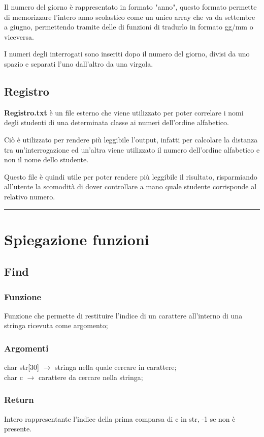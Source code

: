 \documentclass[14pt]{extarticle}
\begin{document}
Il numero del giorno è rappresentato in formato "anno", questo formato permette di memorizzare l'intero anno scolastico come un unico array che va da settembre a giugno, permettendo tramite delle di funzioni di tradurlo in formato gg/mm o viceversa.

I numeri degli interrogati sono inseriti dopo il numero del giorno, divisi da uno spazio e separati l'uno dall'altro da una virgola.
\vspace{50px}
\subsection{Registro}
\textbf{Registro.txt} è un file esterno che viene utilizzato per poter correlare i nomi degli studenti di una determinata classe ai numeri dell'ordine alfabetico.

Ciò è utilizzato per rendere più leggibile l'output, infatti per calcolare la distanza tra un'interrogazione ed un'altra viene utilizzato il numero dell'ordine alfabetico e non il nome dello studente.

Questo file è quindi utile per poter rendere più leggibile il risultato, risparmiando all'utente la scomodità di dover controllare a mano quale studente corrisponde al relativo numero.
\vspace{50px}
\par\noindent\rule{\textwidth}{0.2pt}
\section{Spiegazione funzioni}
\vspace{50px}
\subsection{Find}
\subsubsection*{Funzione}
Funzione che permette di restituire l'indice di un carattere all'interno di una stringa ricevuta come argomento;
\subsubsection*{Argomenti}
char str[30] $\longrightarrow$ stringa nella quale cercare in carattere;
\\char c $\longrightarrow$ carattere da cercare nella stringa;
\subsubsection*{Return}
Intero rappresentante l'indice della prima comparsa di c in str, -1 se non è presente.
\vspace{50px}
\end{document}
